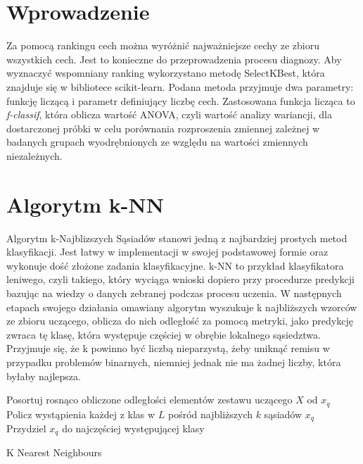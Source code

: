 \section{Wprowadzenie}
Za pomocą rankingu cech można wyróżnić najważniejsze cechy ze zbioru wszystkich cech. Jest to konieczne do przeprowadzenia procesu diagnozy. Aby wyznaczyć wspomniany ranking wykorzystano metodę SelectKBest, która znajduje się w bibliotece scikit-learn. Podana metoda przyjmuje dwa parametry: funkcję liczącą i parametr definiujący liczbę cech. Zastosowana funkcja licząca to \emph {f-classif}, która oblicza wartość ANOVA, czyli wartość analizy wariancji, dla dostarczonej próbki w celu porównania rozproszenia zmiennej zależnej w badanych grupach wyodrębnionych ze względu na wartości zmiennych niezależnych.


\section{Algorytm k-NN}
Algorytm k-Najblizszych Sąsiadów stanowi jedną z najbardziej prostych metod klasyfikacji. Jest łatwy w implementacji w swojej podstawowej formie oraz wykonuje dość złożone zadania klasyfikacyjne. k-NN to przykład klasyfikatora leniwego, czyli takiego, który wyciąga wnioski dopiero przy procedurze predykcji bazując na wiedzy o danych zebranej podczas procesu uczenia. W następnych etapach swojego działania omawiany algorytm wyszukuje k najbliższych wzorców ze zbioru uczącego, oblicza do nich odległość za pomocą metryki, jako predykcję zwraca tę klasę, która występuje częściej w obrębie lokalnego sąsiedztwa. Przyjmuje się, że k powinno być liczbą nieparzystą, żeby uniknąć remisu w przypadku problemów binarnych, niemniej jednak nie ma żadnej liczby, która byłaby najlepsza.

 \begin{algorithm}[!ht]
 \label{algorytm}
\BlankLine
\SetAlgoVlined
{}

Posortuj rosnąco obliczone odległości elementów zestawu uczącego $X$ od $x_{q}$ \\
Policz wystąpienia każdej z klas w $L$ pośród najbliższych $k$ sąsiadów $x_{q}$ \\
Przydziel $x_{q}$ do najczęściej występującej klasy
\caption{K Nearest Neighbours}
\end{algorithm}

